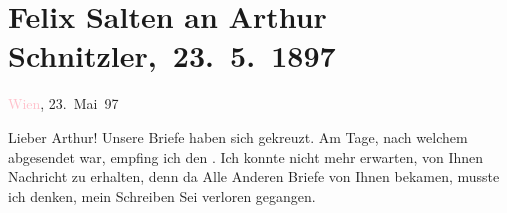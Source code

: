 

\renewcommand{\erwaehntePersonen}{Personen: Richard Beer-Hofmann,  Elisabeth von Österreich-Ungarn,  Franz Joseph I. von Österreich-Ungarn, Paul Goldmann, Hugo von Hofmannsthal, Richard Metzl, Louise Metzl, Ottilie Salten, Adele Sandrock}
\renewcommand{\erwaehnteInstitutionen}{Institutionen: Franz-Joseph-Orden}
\renewcommand{\erwaehnteOrte}{Orte: London, Ostsee, Paris, Riga, Russland, Wien}
\renewcommand{\erwaehnteWerke}{}
\section[ Felix Salten an Arthur Schnitzler, 23. 5. 1897]{Felix Salten an Arthur Schnitzler, 23. 5. 1897}
\nopagebreak{}
\rehead{ }\normalsize\beginnumbering{}
\toendnotes[C]{\smallbreak\pagebreak[2]}
\toendnotes[C]{\smallbreak}
\pstart
           \raggedleft{}{\pb}\textcolor{pink}{Wien}{}\ledrightnote{\textcolor{pink}{Wien}}, 23. Mai 97\pend
           
\pstart
           Lieber Arthur! Unsere Briefe haben sich gekreuzt. Am Tage, nach
               welchem \label{K_L03266-1v}\label{K_L03266-1h} abgesendet war, empfing ich den \label{K_L03266-2v}\label{K_L03266-2h}. Ich konnte nicht mehr erwarten, von
               Ihnen Nachricht zu erhalten, denn da Alle Anderen Briefe von Ihnen bekamen, musste
               ich denken, mein Schreiben Sei verloren gegangen.\pend
           
